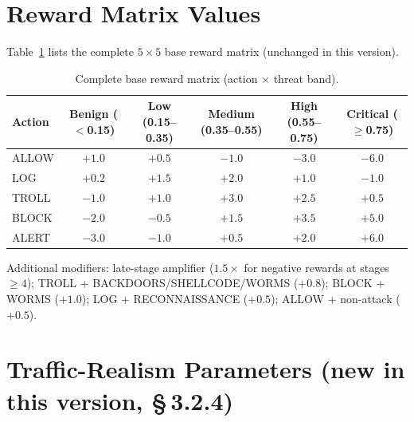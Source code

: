 \section{Reward Matrix Values}

Table~\ref{tab:reward_full} lists the complete $5 \times 5$ base reward
matrix (unchanged in this version).

\begin{table}[ht]
  \centering
  \caption{Complete base reward matrix (action $\times$ threat band).}
  \label{tab:reward_full}
  \begin{tabular}{lccccc}
    \toprule
    Action & Benign ($<$0.15) & Low (0.15--0.35) & Medium (0.35--0.55) & High (0.55--0.75) & Critical ($\geq$0.75) \\
    \midrule
    ALLOW & $+1.0$ & $+0.5$ & $-1.0$ & $-3.0$ & $-6.0$ \\
    LOG   & $+0.2$ & $+1.5$ & $+2.0$ & $+1.0$ & $-1.0$ \\
    TROLL & $-1.0$ & $+1.0$ & $+3.0$ & $+2.5$ & $+0.5$ \\
    BLOCK & $-2.0$ & $-0.5$ & $+1.5$ & $+3.5$ & $+5.0$ \\
    ALERT & $-3.0$ & $-1.0$ & $+0.5$ & $+2.0$ & $+6.0$ \\
    \bottomrule
  \end{tabular}
  \par\smallskip
  \footnotesize Additional modifiers: late-stage amplifier ($1.5\times$ for negative rewards at
  stages $\geq 4$); TROLL + BACKDOORS/SHELLCODE/WORMS ($+0.8$);
  BLOCK + WORMS ($+1.0$); LOG + RECONNAISSANCE ($+0.5$);
  ALLOW + non-attack ($+0.5$).
\end{table}

\section{Traffic-Realism Parameters (new in this version, \S\,3.2.4)}

